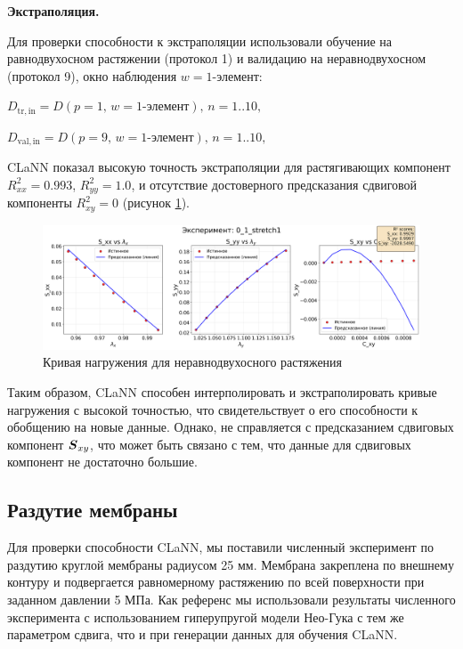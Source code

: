   \textbf{Экстраполяция.}
  
  Для проверки способности к экстраполяции использовали обучение на равнодвухосном растяжении (протокол 1) и валидацию на неравнодвухосном (протокол 9), 
  окно наблюдения $w=\text{1-элемент}$:
  
  $D_{\mathrm{tr,in}} = D(p{=}1,\,w{=}\text{1-элемент}),\, n = 1..10,$
  
  $D_{\mathrm{val,in}} = D(p{=}9,\,w{=}\text{1-элемент}),\, n = 1..10,$
  
  CLaNN показал высокую точность экстраполяции для растягивающих компонент $R^2_{xx}=0.993$, $R^2_{yy}=1.0$, и отсутствие достоверного предсказания сдвиговой компоненты $R^2_{xy}=0$ (рисунок \ref{fig:extrapolation}).


  \begin{figure}[H]
    \centering
    \includegraphics[width=1.0\textwidth]{img/extrapolation.png}
    \caption{Кривая нагружения для неравнодвухосного растяжения}
    \label{fig:extrapolation}
  \end{figure}
   
  Таким образом, CLaNN способен интерполировать и экстраполировать кривые нагружения с высокой точностью, что свидетельствует о его способности к обобщению на новые данные.
  Однако, не справляется с предсказанием сдвиговых компонент $\boldsymbol{S}_{xy}$, что может быть связано с тем, что данные для сдвиговых компонент не достаточно большие.
  
\subsection{Раздутие мембраны}

  Для проверки способности CLaNN, мы поставили численный эксперимент по раздутию круглой мембраны радиусом 25 мм.
  Мембрана закреплена по внешнему контуру и подвергается равномерному растяжению по всей поверхности при заданном давлении
  5 МПа. 
  Как референс мы использовали результаты численного эксперимента с использованием гиперупругой модели Нео-Гука с тем же параметром сдвига, 
  что и при генерации данных для обучения CLaNN.
  
